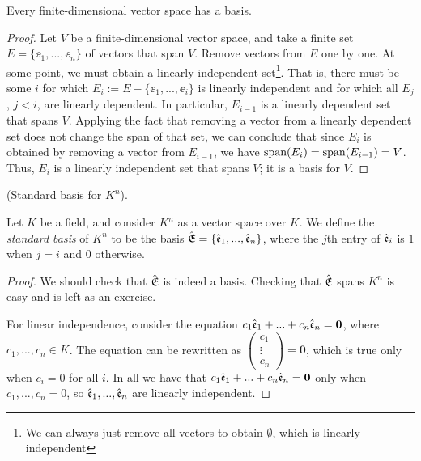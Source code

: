 \begin{theorem}
    Every finite-dimensional vector space has a basis.
\end{theorem}

\begin{proof}
    Let $V$ be a finite-dimensional vector space, and take a finite set $E = \{\ee_1, ..., \ee_n\}$ of vectors that span $V$. Remove vectors from $E$ one by one. At some point, we must obtain a linearly independent set\footnote{We can always just remove all vectors to obtain $\emptyset$, which is linearly independent}. That is, there must be some $i$ for which $E_i := E - \{\ee_1, ..., \ee_i\}$ is linearly independent and for which all $E_j$, $j < i$, are linearly dependent. In particular, $E_{i - 1}$ is a linearly dependent set that spans $V$. Applying the fact that removing a vector from a linearly dependent set does not change the span of that set, we can conclude that since $E_i$ is obtained by removing a vector from $E_{i - 1}$, we have $\text{span}(E_i) = \text{span}(E_{i - 1}) = V$. Thus, $E_i$ is a linearly independent set that spans $V$; it is a basis for $V$.
\end{proof}

\begin{defn}
    (Standard basis for $K^n$).
    
    Let $K$ be a field, and consider $K^n$ as a vector space over $K$. We define the \textit{standard basis} of $K^n$ to be the basis ${\hat{\mathfrak{E}}} = \{\hat{\mathfrak{e}}_1, ..., \hat{\mathfrak{e}}_n\}$, where the $j$th entry of $\hat{\mathfrak{e}}_i$ is $1$ when $j = i$ and $0$ otherwise.
\end{defn}

\begin{proof}
   We should check that ${\hat{\mathfrak{E}}}$ is indeed a basis. Checking that ${\hat{\mathfrak{E}}}$ spans $K^n$ is easy and is left as an exercise.
   
   For linear independence, consider the equation $c_1 \hat{\mathfrak{e}}_1 + ... + c_n \hat{\mathfrak{e}}_n = \mathbf{0}$, where $c_1, ..., c_n \in K$. The equation can be rewritten as $\begin{pmatrix} c_1 \\ \vdots \\ c_n \end{pmatrix} = \mathbf{0}$, which is true only when $c_i = 0$ for all $i$. In all we have that $c_1 \hat{\mathfrak{e}}_1 + ... + c_n \hat{\mathfrak{e}}_n = \mathbf{0}$ only when $c_1, ..., c_n = 0$, so $\hat{\mathfrak{e}}_1, ..., \hat{\mathfrak{e}}_n$ are linearly independent.
\end{proof}

